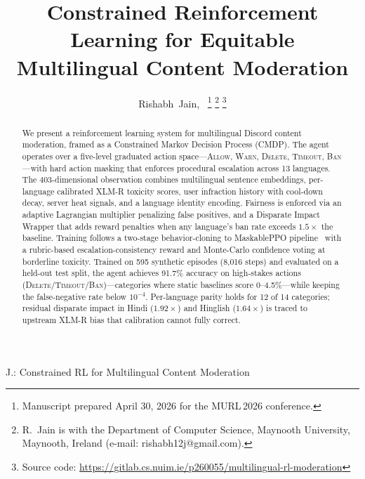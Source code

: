 \documentclass[journal]{IEEEtran}
\begin{document}
\title{Constrained Reinforcement Learning for Equitable\\Multilingual Content Moderation}

\author{Rishabh~Jain,~%
  \thanks{Manuscript prepared April 30, 2026 for the MURL\,2026 conference.}
  \thanks{R.~Jain is with the Department of Computer Science, Maynooth University,
          Maynooth, Ireland (e-mail: rishabh12j@gmail.com).}
  \thanks{Source code: \url{https://gitlab.cs.nuim.ie/p260055/multilingual-rl-moderation}}}

%
{J.: Constrained RL for Multilingual Content Moderation}

\maketitle


\begin{abstract}
We present a reinforcement learning system for multilingual Discord content moderation,
framed as a Constrained Markov Decision Process (CMDP). The agent operates over a
five-level graduated action space---\textsc{Allow}, \textsc{Warn}, \textsc{Delete},
\textsc{Timeout}, \textsc{Ban}---with hard action masking that enforces procedural
escalation across 13 languages. The 403-dimensional observation combines multilingual
sentence embeddings, per-language calibrated XLM-R toxicity scores, user infraction
history with cool-down decay, server heat signals, and a language identity encoding.
Fairness is enforced via an adaptive Lagrangian multiplier penalizing false positives,
and a Disparate Impact Wrapper that adds reward penalties when any language's ban rate
exceeds $1.5\times$ the baseline. Training follows a two-stage behavior-cloning to
MaskablePPO pipeline~\cite{liu2025meta} with a rubric-based escalation-consistency
reward and Monte-Carlo confidence voting at borderline toxicity. Trained on 595
synthetic episodes (8,016 steps) and evaluated on a held-out test split, the agent
achieves 91.7\% accuracy on high-stakes actions (\textsc{Delete}/\textsc{Timeout}/\textsc{Ban})---categories
where static baselines score 0--4.5\%---while keeping the false-negative rate below
$10^{-4}$. Per-language parity holds for 12 of 14 categories; residual disparate impact
in Hindi ($1.92\times$) and Hinglish ($1.64\times$) is traced to upstream XLM-R bias
that calibration cannot fully correct.
\end{abstract}
\end{document}
